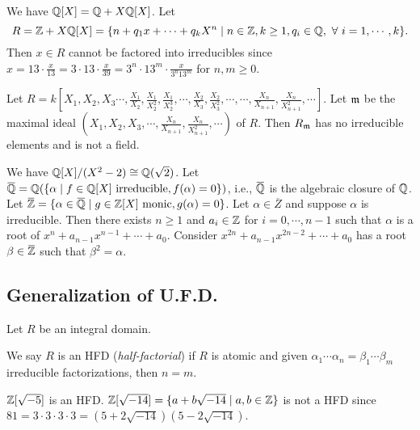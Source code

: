 \begin{example} \label{1.85}
    We have $\mathbb{Q}[X] = \mathbb{Q} + X\mathbb{Q}[X]$. Let 
    \[R = \mathbb{Z} + X \mathbb{Q}[X] = \{n + q_1x + \cdots + q_kX^{n} \mid n \in \mathbb{Z}, k \geq 1, q_i \in \mathbb{Q},\ \forall \  i = 1,\cdots,k\}.\]
    Then $x \in R$ cannot be factored into irreducibles since $x = 13 \cdot \frac{x}{13} = 3 \cdot 13 \cdot \frac{x}{39} = 3^{n} \cdot 13^{m} \cdot \frac{x}{3^{n}13^{m}}$ for $n,m \geq 0$.
\end{example}

\begin{example}\label{1.86}
    Let $R = k[X_1,X_2,X_3\cdots,\frac{X_1}{X_2},\frac{X_1}{X_2^{2}},\frac{X_1}{X_2^{3}},\cdots,\frac{X_2}{X_3},\frac{X_2}{X_3^{2}},\cdots,\cdots,\frac{X_n}{X_{n+1}},\frac{X_n}{X_{n+1}^{2}},\cdots]$. Let $\mathfrak{m}$ be the maximal ideal $(X_1,X_2,X_3,\cdots,\frac{X_n}{X_{n+1}},\frac{X_n}{X_{n+1}^{2}},\cdots)$ of $R$. Then $R_{\mathfrak{m}}$ has no irreducible elements and is not a field.
\end{example}

\begin{example}\label{1.87}
    We have $\mathbb{Q}[X]/(X^{2}-2) \cong \mathbb{Q}(\sqrt 2)$. Let $\overbar{\bbQ} = \bbQ(\{\alpha \mid f \in \bbQ[X] \text{ irreducible}, f(\alpha) = 0\})$, i.e., $\overbar{\bbQ}$ is the algebraic closure of $\mathbb{Q}$. Let $\overbar{\bbZ} = \{\alpha \in \overbar{\bbQ} \mid g \in \bbZ[X] \text{ monic},g(\alpha) = 0\}$. Let $\alpha \in \overbar{Z}$ and suppose $\alpha$ is irreducible. Then there exists $n \geq 1$ and $a_i \in \mathbb{Z}$ for $i=0,\cdots,n-1$ such that $\alpha$ is a root of $x^{n} + a_{n-1}x^{n-1} + \cdots + a_0$. Consider $x^{2n} + a_{n-1}x^{2n-2} + \cdots + a_0$ has a root $\beta \in \overbar{\bbZ}$ such that $\beta^{2} = \alpha$.
\end{example}


\subsection*{Generalization of U.F.D.}

Let $R$ be an integral domain.

\begin{definition}\label{1.88}
    We say $R$ is an HFD (\emph{half-factorial}) if $R$ is atomic and given $\alpha_1 \cdots \alpha_n = \beta_1 \cdots \beta_m$ irreducible factorizations, then $n = m$.
\end{definition}

\begin{example}\label{1.89}
    $\mathbb{Z}[\sqrt {-5}]$ is an HFD. $\mathbb{Z}[\sqrt{-14}] = \{a+b\sqrt{-14} \mid a,b \in \mathbb{Z}\}$ is not a HFD since $81 = 3 \cdot 3 \cdot 3 \cdot 3 = (5+2\sqrt{-14})(5-2\sqrt{-14})$.
\end{example}

